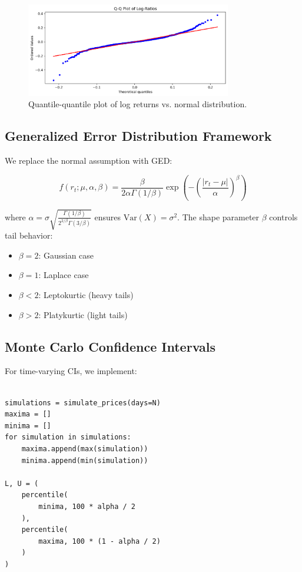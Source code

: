 \documentclass[12pt]{article}
\begin{document}
\begin{figure}[H]
    \centering
    \includegraphics[width=0.8\textwidth]{qq_plot2.png}
    \caption{Quantile-quantile plot of log returns vs. normal distribution.}
    \label{fig:qq}
\end{figure}

\subsection{Generalized Error Distribution Framework}
We replace the normal assumption with GED:

\begin{equation}
    f(r_t; \mu, \alpha, \beta) = \frac{\beta}{2\alpha\Gamma(1/\beta)} \exp\left(-\left(\frac{|r_t-\mu|}{\alpha}\right)^\beta\right)
\end{equation}

where $\alpha = \sigma \sqrt{\frac{\Gamma(1/\beta)}{2^{2/\beta}\Gamma(3/\beta)}}$ ensures $\text{Var}(X) = \sigma^2$. The shape parameter $\beta$ controls tail behavior:

\begin{itemize}
    \item $\beta = 2$: Gaussian case
    \item $\beta = 1$: Laplace case
    \item $\beta < 2$: Leptokurtic (heavy tails)
    \item $\beta > 2$: Platykurtic (light tails)
\end{itemize}

\subsection{Monte Carlo Confidence Intervals}
For time-varying CIs, we implement:

\begin{lstlisting}

simulations = simulate_prices(days=N)
maxima = []
minima = []
for simulation in simulations:
    maxima.append(max(simulation))
    minima.append(min(simulation))

L, U = (
    percentile(
        minima, 100 * alpha / 2
    ),
    percentile(
        maxima, 100 * (1 - alpha / 2)
    )
)

\end{lstlisting}
\end{document}
